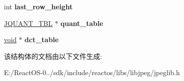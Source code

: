 \begin{DoxyCompactItemize}
int {\bfseries last\+\_\+row\+\_\+height}
\item 
\mbox{\label{structjpeg__component__info_afd551e8e9dbc3f3076c10cd4d391fdac}} 
\hyperlink{struct_j_q_u_a_n_t___t_b_l}{J\+Q\+U\+A\+N\+T\+\_\+\+T\+BL} $\ast$ {\bfseries quant\+\_\+table}
\item 
\mbox{\label{structjpeg__component__info_a9f68a39fc17561866668c1b9d4a8f238}} 
\hyperlink{interfacevoid}{void} $\ast$ {\bfseries dct\+\_\+table}
\end{DoxyCompactItemize}


该结构体的文档由以下文件生成\+:\begin{DoxyCompactItemize}
\item 
E\+:/\+React\+O\+S-\/0../sdk/include/reactos/libs/libjpeg/jpeglib.\+h\end{DoxyCompactItemize}
